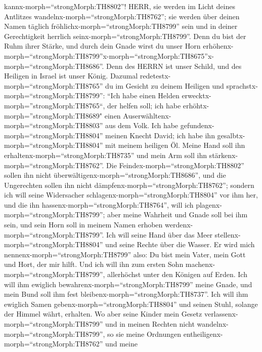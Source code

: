 kannx-morph=``strongMorph:TH8802''! HERR, sie werden im Licht deines
Antlitzes wandelnx-morph=``strongMorph:TH8762'';  sie
werden über deinen Namen täglich fröhlichx-morph=``strongMorph:TH8799''
sein und in deiner Gerechtigkeit herrlich
seinx-morph=``strongMorph:TH8799''.  Denn du bist der Ruhm
ihrer Stärke, und durch dein Gnade wirst du unser Horn
erhöhenx-morph=``strongMorph:TH8799''\textbar x-morph=``strongMorph:TH8675''x-morph=``strongMorph:TH8686''.
 Denn des HERRN ist unser Schild, und des Heiligen in
Israel ist unser König.  Dazumal
redetestx-morph=``strongMorph:TH8765'' du im Gesicht zu deinem Heiligen
und sprachstx-morph=``strongMorph:TH8799'': ``Ich habe einen Helden
erwecktx-morph=''strongMorph:TH8765``, der helfen soll; ich habe
erhöhtx-morph=''strongMorph:TH8689" einen
Auserwähltenx-morph=``strongMorph:TH8803'' aus dem Volk. 
Ich habe gefundenx-morph=``strongMorph:TH8804'' meinen Knecht David; ich
habe ihn gesalbtx-morph=``strongMorph:TH8804'' mit meinem heiligen Öl.
 Meine Hand soll ihn erhaltenx-morph=``strongMorph:TH8735''
und mein Arm soll ihn stärkenx-morph=``strongMorph:TH8762''.
 Die Feindex-morph=``strongMorph:TH8802'' sollen ihn nicht
überwältigenx-morph=``strongMorph:TH8686'', und die Ungerechten sollen
ihn nicht dämpfenx-morph=``strongMorph:TH8762'';  sondern
ich will seine Widersacher schlagenx-morph=``strongMorph:TH8804'' vor
ihm her, und die ihn hassenx-morph=``strongMorph:TH8764'', will ich
plagenx-morph=``strongMorph:TH8799'';  aber meine Wahrheit
und Gnade soll bei ihm sein, und sein Horn soll in meinem Namen erhoben
werdenx-morph=``strongMorph:TH8799''.  Ich will seine Hand
über das Meer stellenx-morph=``strongMorph:TH8804'' und seine Rechte
über die Wasser.  Er wird mich
nennenx-morph=``strongMorph:TH8799'' also: Du bist mein Vater, mein Gott
und Hort, der mir hilft.  Und ich will ihn zum ersten Sohn
machenx-morph=``strongMorph:TH8799'', allerhöchst unter den Königen auf
Erden.  Ich will ihm ewiglich
bewahrenx-morph=``strongMorph:TH8799'' meine Gnade, und mein Bund soll
ihm fest bleibenx-morph=``strongMorph:TH8737''.  Ich will
ihm ewiglich Samen gebenx-morph=``strongMorph:TH8804'' und seinen Stuhl,
solange der Himmel währt, erhalten.  Wo aber seine Kinder
mein Gesetz verlassenx-morph=``strongMorph:TH8799'' und in meinen
Rechten nicht wandelnx-morph=``strongMorph:TH8799'',  so
sie meine Ordnungen entheiligenx-morph=``strongMorph:TH8762'' und meine
